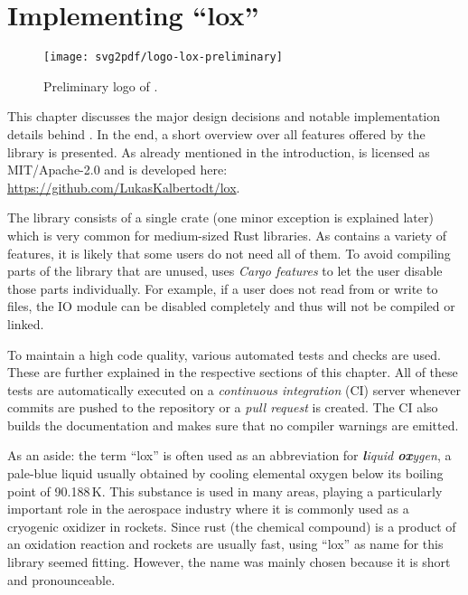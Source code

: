 \chapter{Implementing \enquote{lox}}

\vspace{-8mm}
\begin{figure}[h]
  \centering
  \texttt{[image: svg2pdf/logo-lox-preliminary]}
  \caption{Preliminary logo of .}
\end{figure}
\vspace{8mm}

This chapter discusses the major design decisions and notable implementation details behind .
In the end, a short overview over all features offered by the library is presented.
As already mentioned in the introduction,  is licensed as MIT/Apache-2.0 and is developed here: \url{https://github.com/LukasKalbertodt/lox}.

The library consists of a single crate (one minor exception is explained later) which is very common for medium-sized Rust libraries.
As  contains a variety of features, it is likely that some users do not need all of them.
To avoid compiling parts of the library that are unused,  uses \emph{Cargo features} to let the user disable those parts individually.
For example, if a user does not read from or write to files, the IO module can be disabled completely and thus will not be compiled or linked.

To maintain a high code quality, various automated tests and checks are used.
These are further explained in the respective sections of this chapter.
All of these tests are automatically executed on a \emph{continuous integration} (CI) server whenever commits are pushed to the repository or a \emph{pull request} is created.
The CI also builds the documentation and makes sure that no compiler warnings are emitted.


\vfill
\begin{center}
  \begin{minipage}{.9\textwidth}
    \small
    As an aside:
    the term \enquote{lox} is often used as an abbreviation for \emph{\textbf{l}iquid \textbf{ox}ygen}, a pale-blue liquid usually obtained by cooling elemental oxygen below its boiling point of 90.188\,K.
    This substance is used in many areas, playing a particularly important role in the aerospace industry where it is commonly used as a cryogenic oxidizer in rockets.
    Since rust (the chemical compound\footnotemark) is a product of an oxidation reaction and rockets are usually fast, using \enquote{lox} as name for this library seemed fitting.
    However, the name was mainly chosen because it is short and pronounceable.
  \end{minipage}
\end{center}


\newpage


\newpage


\newpage


\newpage


\newpage

